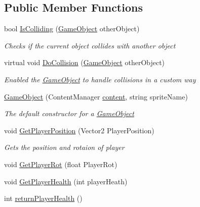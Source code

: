 \subsection*{Public Member Functions}
\begin{DoxyCompactItemize}
\item 
bool \mbox{\hyperlink{class_game2_1_1_game_object_a043206229a679b32a1bee4f50e8e7ace}{Is\+Colliding}} (\mbox{\hyperlink{class_game2_1_1_game_object}{Game\+Object}} other\+Object)
\begin{DoxyCompactList}\small\item\em Checks if the current object collides with another object \end{DoxyCompactList}\item 
virtual void \mbox{\hyperlink{class_game2_1_1_game_object_aa811d23c405b9aa28ab922901d0a3002}{Do\+Collision}} (\mbox{\hyperlink{class_game2_1_1_game_object}{Game\+Object}} other\+Object)
\begin{DoxyCompactList}\small\item\em Enabled the \mbox{\hyperlink{class_game2_1_1_game_object}{Game\+Object}} to handle collisions in a custom way \end{DoxyCompactList}\item 
\mbox{\hyperlink{class_game2_1_1_game_object_ad2a99e120df1d04d1a737bbf9b8fb2a0}{Game\+Object}} (Content\+Manager \mbox{\hyperlink{class_game2_1_1_game_object_ae8a9e4574e531d2fbb2168a155f2ac53}{content}}, string sprite\+Name)
\begin{DoxyCompactList}\small\item\em The default constructor for a \mbox{\hyperlink{class_game2_1_1_game_object}{Game\+Object}} \end{DoxyCompactList}\item 
void \mbox{\hyperlink{class_game2_1_1_game_object_a3379bff2fa0d79ae4eeea4f1e9609064}{Get\+Player\+Position}} (Vector2 Player\+Position)
\begin{DoxyCompactList}\small\item\em Gets the position and rotaion of player \end{DoxyCompactList}\item 
void \mbox{\hyperlink{class_game2_1_1_game_object_aae6ebb6727aabac812b8bcc68aba2484}{Get\+Player\+Rot}} (float Player\+Rot)
\item 
void \mbox{\hyperlink{class_game2_1_1_game_object_add937595f4f6918a828af495c08bce3d}{Get\+Player\+Health}} (int player\+Heath)
\item 
int \mbox{\hyperlink{class_game2_1_1_game_object_a9db72e4b451539bf698e5e1dcd6e12c4}{return\+Player\+Health}} ()

\end{DoxyCompactItemize}
